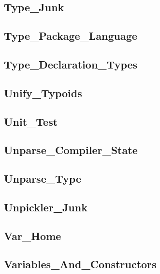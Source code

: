 \subsection{Type\_Junk}					
\subsection{Type\_Package\_Language}			
\subsection{Type\_Declaration\_Types}			
\subsection{Unify\_Typoids}				
\subsection{Unit\_Test}					
\subsection{Unparse\_Compiler\_State}			
\subsection{Unparse\_Type}				
\subsection{Unpickler\_Junk}				
\subsection{Var\_Home}					
\subsection{Variables\_And\_Constructors}		


